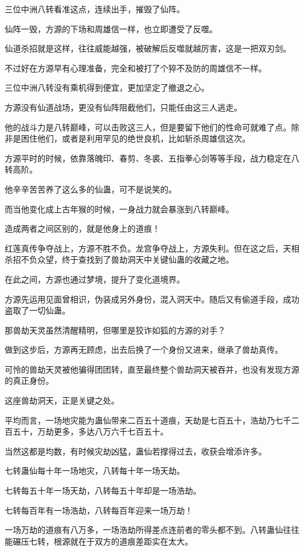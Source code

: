 \begin{this_body}
三位中洲八转看准这点，连续出手，摧毁了仙阵。

仙阵一毁，方源的下场和周雄信一样，也立即遭受了反噬。

仙道杀招就是这样，往往威能越强，被破解后反噬就越厉害，这是一把双刃剑。

不过好在方源早有心理准备，完全和被打了个猝不及防的周雄信不一样。

三位中洲八转没有乘机得到便宜，更加坚定了撤退之心。

方源没有仙道战场，更没有仙阵阻截他们，只能任由这三人逃走。

他的战斗力是八转巅峰，可以击败这三人，但是要留下他们的性命可就难了点。除非是困住他们，或者是利用罕见的绝世良机，比如斩杀周雄信这次。

方源平时的时候，依靠落魄印、春剪、冬裘、五指拳心剑等等手段，战力稳定在八转高阶。

他辛辛苦苦养了这么多的仙蛊，可不是说笑的。

而当他变化成上古年猴的时候，一身战力就会暴涨到八转巅峰。

造成两者之间区别的，就是他身上的道痕！

红莲真传争夺战上，方源不胜不负。龙宫争夺战上，方源失利。但在这之后，天相杀招不负众望，终于查找到了兽劫洞天中关键仙蛊的收藏之地。

在此之间，方源也通过梦境，提升了变化道境界。

方源先运用见面曾相识，伪装成另外身份，混入洞天中。随后又有偷道手段，成功盗取了一切仙蛊。

那兽劫天灵虽然清醒精明，但哪里是狡诈如狐的方源的对手？

做到这步后，方源再无顾虑，出去后换了一个身份又进来，继承了兽劫真传。

可怜的兽劫天灵被他骗得团团转，直至最终整个兽劫洞天被吞并，也没有发现方源的真正身份。

这座兽劫洞天，正是关键之处。

平均而言，一场地灾能为蛊仙带来二百五十道痕，天劫是七百五十，浩劫乃七千二百五十，万劫更多，多达八万六千七百五十。

当然这都是均数，有时候灾劫凶猛，蛊仙若撑得过去，收获会增添许多。

七转蛊仙每十年一场地灾，八转每十年一场天劫。

七转每五十年一场天劫，八转每五十年却是一场浩劫。

七转每百年有一场浩劫，八转每百年迎来一场万劫！

一场万劫的道痕有八万多，一场浩劫所得差点连前者的零头都不到。八转蛊仙往往能碾压七转，根源就在于双方的道痕差距实在太大。


\end{this_body}
